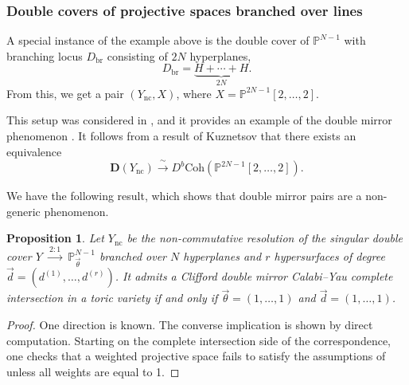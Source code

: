 \documentclass[12pt,a4paper,oneside]{amsart}
\numberwithin{equation}{section}
\newtheorem{prop}[thm]{Proposition}
\theoremstyle{definition}
\theoremstyle{remark}
\newcommand{\cP}{\mathbb{P}}
\newcommand{\Ync}{Y_{\mathrm{nc}}}
\newcommand{\DC}{\mathbf{D}}
\begin{document}
\subsubsection{Double covers of projective spaces branched over lines}
A special instance of the example above is the double cover of $\cP^{N-1}$ with branching locus $D_{\mathrm{br}}$ consisting of $2N$ hyperplanes, 
\begin{equation*}
	D_{\mathrm{br}}= \underbrace{H+ \cdots +H}_{2N}.
\end{equation*}
From this, we get a pair $(\Ync,X)$, where $X=\cP^{2N-1}[2, \dots, 2]$.\par
This setup was considered in \cite{Caldararu:2010ljp,Sharpe:2012ji}, and it provides an example of the double mirror phenomenon \cite{BorisovLi}. It follows from a result of Kuznetsov \cite{Kuznetsov:08} that there exists an equivalence 
\begin{equation*}
	\DC (\Ync) \xrightarrow{ \ \sim \ } D^b \mathrm{Coh}\left( \cP^{2N-1}[2, \dots, 2] \right) .
\end{equation*}\par
We have the following result, which shows that double mirror pairs are a non-generic phenomenon.
\begin{prop}
	Let $\Ync$ be the non-commutative resolution of the singular double cover $Y \ \xrightarrow{ \ 2:1 \ } \ \cP^{N-1}_{\vec{\theta}} $ branched over $N$ hyperplanes and $r$ hypersurfaces of degree $\vec{d}=(d^{(1)}, \dots, d^{(r)})$. It admits a Clifford double mirror Calabi--Yau complete intersection in a toric variety if and only if $\vec{\theta}=(1,\dots,1)$ and $\vec{d}=(1, \dots, 1)$.
\end{prop}
\begin{proof}
	One direction is known. 
	The converse implication is shown by direct computation. Starting on the complete intersection side of the correspondence, one checks that a weighted projective space fails to satisfy the assumptions of \cite{BorisovLi} unless all weights are equal to 1.
\end{proof}\par
\end{document}
